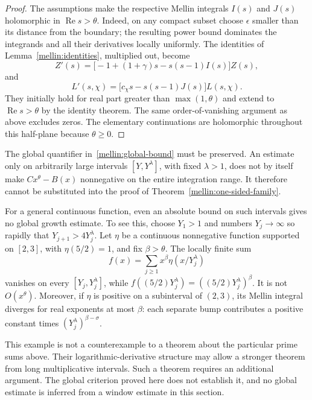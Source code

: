 \begin{proof}
The assumptions make the respective Mellin integrals $I(s)$ and $J(s)$
holomorphic in $\operatorname{Re}s>\theta$.  Indeed, on any compact
subset choose $\epsilon$ smaller than its distance from the boundary;
the resulting power bound dominates the integrands and all their
derivatives locally uniformly.  The identities of
Lemma~\ref{mellin:identities}, multiplied out, become
\[
 Z'(s)=\bigl[-1+(1+\gamma)s-s(s-1)I(s)\bigr]Z(s),
\]
and
\[
 L'(s,\chi)=\bigl[c_\chi s-s(s-1)J(s)\bigr]L(s,\chi).
\]
They initially hold for real part greater than $\max(1,\theta)$ and
extend to $\operatorname{Re}s>\theta$ by the identity theorem.
The same order-of-vanishing argument as above excludes zeros.
The elementary continuations are holomorphic throughout this
half-plane because $\theta\geq0$.
\end{proof}

The global quantifier in~\eqref{mellin:global-bound} must be preserved.
An estimate only on arbitrarily large intervals
$[Y,Y^\lambda]$, with fixed $\lambda>1$, does not by itself make
$Cx^\theta-B(x)$ nonnegative on the entire integration range.  It
therefore cannot be substituted into the proof of
Theorem~\ref{mellin:one-sided-family}.

For a general continuous function, even an absolute bound on such
intervals gives no global growth estimate.  To see this, choose $Y_1>1$ and numbers
$Y_j\to\infty$ so rapidly that
$Y_{j+1}>4Y_j^\lambda$.  Let $\eta$ be a continuous nonnegative function
supported on $[2,3]$, with $\eta(5/2)=1$, and fix $\beta>\theta$.
The locally finite sum
\[
 f(x)=\sum_{j\geq1}x^\beta\eta(x/Y_j^\lambda)
\]
vanishes on every $[Y_j,Y_j^\lambda]$, while
$f((5/2)Y_j^\lambda)=((5/2)Y_j^\lambda)^\beta$.
It is not $O(x^\theta)$.  Moreover, if $\eta$ is positive on a
subinterval of $(2,3)$, its Mellin integral diverges for real exponents
at most $\beta$: each separate bump contributes a positive constant
times $(Y_j^\lambda)^{\beta-\sigma}$.

This example is not a counterexample to a theorem about the particular
prime sums above.  Their logarithmic-derivative structure may allow a
stronger theorem from long multiplicative intervals.  Such a theorem
requires an additional argument.  The global criterion proved here
does not establish it, and no global estimate is inferred from a
window estimate in this section.
